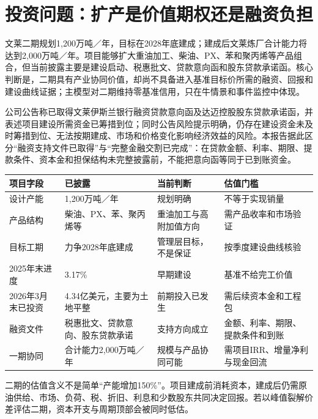 \section{投资问题：扩产是价值期权还是融资负担}

文莱二期规划1,200万吨／年，目标在2028年底建成；建成后文莱炼厂合计能力将达到2,000万吨／年。项目能够扩大重油加工、柴油、PX、苯和聚丙烯等产品组合，但当前披露主要是建设启动、税惠批文、贷款意向函和股东贷款承诺函。核心判断是，二期具有产业协同价值，却尚不具备进入基准目标价所需的融资、回报和建设曲线证据；主模型对二期维持零基准信用，只在牛情景和事件监控中体现。

公司公告称已取得文莱伊斯兰银行融资贷款意向函及达迈控股股东贷款承诺函，并表述项目建设所需资金已筹措到位；同时公告风险提示明确，仍存在建设资金未及时筹措到位、无法按期建成、市场和价格变化影响经济效益的风险。本报告据此区分“融资支持文件已取得”与“完整金融交割已完成”：在贷款金额、利率、期限、提款条件、资本金和担保结构未完整披露前，不能把意向函等同于已到账资金。

\begin{exhibitbox}[文莱二期项目状态]
\noindent\begin{tabularx}{\textwidth}{L{3.25cm}L{2.45cm}L{2.55cm}X}
\toprule
\textbf{项目字段} & \textbf{已披露} & \textbf{当前判断} & \textbf{估值门槛} \\
\midrule
设计产能 & 1,200万吨／年 & 规划明确 & 不等于实现销量 \\
产品结构 & 柴油、PX、苯、聚丙烯等 & 重油加工与高附加值方向 & 需产品收率和市场验证 \\
目标工期 & 力争2028年底建成 & 管理层目标，不是保证 & 按季度建设曲线核验 \\
2025年末进度 & 3.17\% & 早期建设 & 基准不给完工价值 \\
2026年3月末已投资 & 4.34亿美元，主要为土地平整 & 前期投入已发生 & 需后续资本金和工程包 \\
融资文件 & 税惠批文、贷款意向、股东贷款承诺 & 支持方向成立 & 金额、利率、期限、提款条件和到账 \\
一期协同 & 合计能力2,000万吨／年 & 规模与产品协同可能 & 需项目IRR、增量净利与现金回流 \\
\bottomrule
\end{tabularx}
\end{exhibitbox}

二期的估值含义不是简单“产能增加150\%”。项目建成前消耗资本，建成后仍需原油供给、市场、负荷、税、折旧、利息和少数股东共同决定回报。若以峰值裂解价差评估二期，资本开支与周期顶部会被同时低估。

